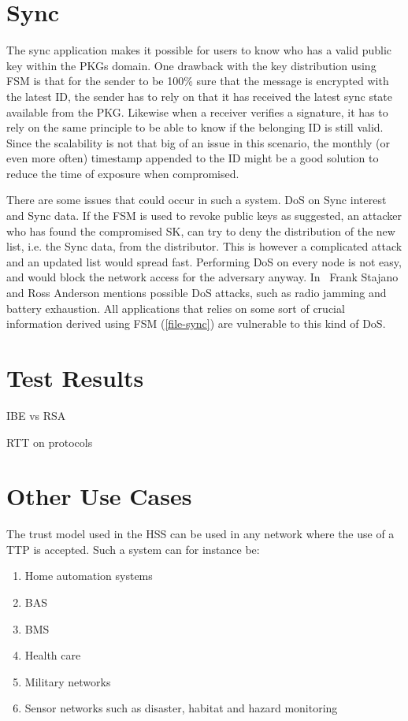 \section{Sync}
The sync application makes it possible for users to know who has a valid public key within the \gls{PKG}s domain.
One drawback with the key distribution using \gls{FSM} is that for the sender to be 100\% sure that the message is encrypted with the latest \gls{ID}, the sender has to rely on that it has received the latest sync state available from the \gls{PKG}.
Likewise when a \gls{receiver} verifies a signature, it has to rely on the same principle to be able to know if the belonging \gls{ID} is still valid.
Since the scalability is not that big of an issue in this scenario, the monthly (or even more often) timestamp appended to the \gls{ID} might be a good solution to reduce the time of exposure when compromised.

There are some issues that could occur in such a system. 
\gls{DoS} on Sync \gls{interest} and Sync \gls{data}. 
If the \gls{FSM} is used to revoke public keys as suggested, an attacker who has found the compromised \gls{SK}, can try to deny the distribution of the new list, i.e. the Sync \gls{data}, from the distributor. 
This is however a complicated attack and an updated list would spread fast.
Performing \gls{DoS} on every node is not easy, and would block the network access for the adversary anyway.
In~\cite{DBLP:conf/spw/StajanoA99} Frank Stajano and Ross Anderson mentions possible \gls{DoS} attacks, such as radio jamming and battery exhaustion. 
All applications that relies on some sort of crucial information derived using \gls{FSM} (\autoref{file-sync}) are vulnerable to this kind of \gls{DoS}.

\section{Test Results}
IBE vs RSA

RTT on protocols



\section{Other Use Cases}
The trust model used in the \gls{HSS} can be used in any network where the use of a \gls{TTP} is accepted. 
Such a system can for instance be:
\begin{enumerate}
	\item Home automation systems
	\item \gls{BAS}
	\item \gls{BMS}
	\item Health care
	\item Military networks
	\item Sensor networks such as disaster, habitat and hazard monitoring
\end{enumerate}



